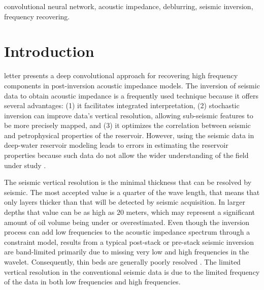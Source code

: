 \documentclass[journal]{IEEEtran}
\begin{document}
\begin{IEEEkeywords}
convolutional neural network, acoustic impedance, deblurring, seismic inversion, frequency recovering.
\end{IEEEkeywords}

\IEEEpeerreviewmaketitle



\section{Introduction}

 letter presents a deep convolutional
approach for recovering high frequency components in
post-inversion acoustic impedance models. The inversion of
seismic data to obtain acoustic impedance is a frequently
used technique because it offers several advantages: (1) it
facilitates integrated interpretation, (2) stochastic
inversion can improve data's vertical resolution, allowing
sub-seismic features to be more precisely mapped, and (3)
it optimizes the correlation between seismic and petrophysical
properties of the reservoir. However, using the seismic data in
deep-water reservoir modeling leads to errors in estimating
the reservoir properties because such data do not allow the
wider understanding of the field under study \cite{Sergio2016}.

The seismic vertical resolution is the minimal thickness that
can be resolved by seismic. The most accepted value is a quarter
of the wave length, that means that only layers thicker than
that will be detected by seismic acquisition. In larger depths
that value can be as high as $20$ meters, which may represent a
significant amount of oil volume being under or overestimated.
Even though the inversion
process can add low frequencies to the acoustic impedance
spectrum through a constraint model, results from a typical
post-stack or pre-stack seismic inversion are band-limited
primarily due to missing very low and high frequencies in the
wavelet. Consequently, thin beds are generally poorly resolved
\cite{Zhang2012}. The limited vertical resolution in the
conventional seismic data is due to the limited frequency of
the data in both low frequencies and high frequencies.
\end{document}
